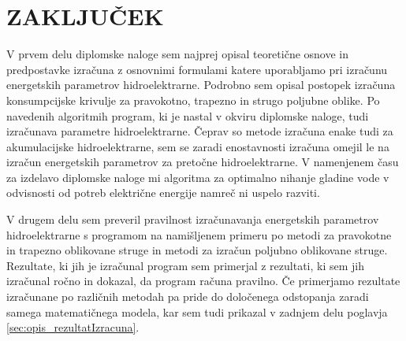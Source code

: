 
\chapter{ZAKLJUČEK}

V prvem delu diplomske naloge sem najprej opisal teoretične osnove in predpostavke izračuna z osnovnimi formulami katere uporabljamo pri izračunu energetskih parametrov hidroelektrarne. Podrobno sem opisal postopek izračuna konsumpcijske krivulje za pravokotno, trapezno in strugo poljubne oblike. Po navedenih algoritmih program, ki je nastal v okviru diplomske naloge, tudi izračunava parametre hidroelektrarne. Čeprav so metode izračuna enake tudi za akumulacijske hidroelektrarne, sem se zaradi enostavnosti izračuna omejil le na izračun energetskih parametrov za pretočne hidroelektrarne. V namenjenem času za izdelavo diplomske naloge mi algoritma za optimalno nihanje gladine vode v odvisnosti od potreb električne energije namreč ni uspelo razviti.


V drugem delu sem preveril pravilnost izračunavanja energetskih parametrov hidroelektrarne s programom na namišljenem primeru po metodi za pravokotne in trapezno oblikovane struge in metodi za izračun poljubno oblikovane struge. Rezultate, ki jih je izračunal program sem primerjal z rezultati, ki sem jih izračunal ročno in dokazal, da program računa pravilno. Če primerjamo rezultate izračunane po različnih metodah pa pride do določenega odstopanja zaradi samega matematičnega modela, kar sem tudi prikazal v zadnjem delu poglavja \ref{sec:opis_rezultatIzracuna}.


